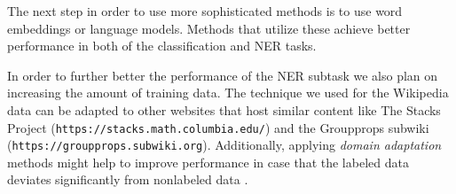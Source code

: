 \documentclass[a4paper]{easychair}
\begin{document}
The next step in order to use more sophisticated methods is to use  word embeddings or language models. Methods that utilize these achieve better performance in both of the classification and NER tasks. 

In order to further better the performance of the NER subtask we also plan on increasing the amount of training data. The technique we used for the Wikipedia data can be adapted to other websites that host similar content like The Stacks Project (\texttt{https://stacks.math.columbia.edu/}) and the Groupprops subwiki (\texttt{https://groupprops.subwiki.org}). Additionally, applying  \emph{domain adaptation} methods might help to improve performance in case that the labeled data deviates significantly from nonlabeled data \cite{domainAdaptation}.




\end{document}
